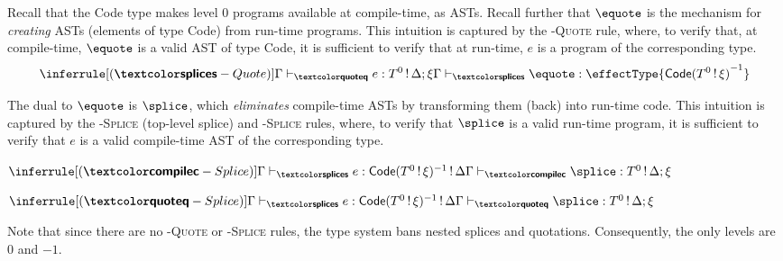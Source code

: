 Recall that the \textsf{Code} type makes level $0$ programs available at compile-time, as ASTs. Recall further that $\equote$ is the mechanism for \textit{creating} ASTs (elements of type \textsf{Code}) from run-time programs. This intuition is captured by the \textsc{\splicemode{}-Quote} rule, where, to verify that, at compile-time, $\equote$ is a valid AST of type \textsf{Code}, it is sufficient to verify that at run-time, $e$ is a program of the corresponding type.
\[\inferrule[(\splicemode{}-Quote)]{\qtypejudge{e}{\runtimecomptype{T^{0}}{\Delta ; \xi}}}{\stypejudge{\equote}{\effectType{\compiletimetype{\textsf{Code}(\runtimecomptype{T^{0}}{\xi})}^{-1}}}}\]

The dual to $\equote$ is $\splice$, which \textit{eliminates} compile-time ASTs by transforming them (back) into run-time code. This intuition is captured by the \textsc{\compilemode{}-Splice} (top-level splice) and \textsc{\quotemode{}-Splice} rules, where, to verify that $\splice$ is a valid run-time program, it is sufficient to verify that $e$ is a valid compile-time AST of the corresponding type. 

\begin{center}
\begin{minipage}[t]{0.5\textwidth}
  \centering
  $\inferrule[(\compilemode{}-Splice)]{\stypejudge[\Gamma]{e}{\textsf{Code}(T^0 \, ! \, \xi)^{-1} \, ! \, \Delta}}{\ctypejudge{\splice}{\runtimecomptype{T^0}{\Delta ; \xi}}}$
\end{minipage}%
\begin{minipage}[t]{0.5\textwidth}
  \centering
  $\inferrule[(\quotemode{}-Splice)]{\stypejudge[\Gamma]{e}{\textsf{Code}(T^0 \, ! \, \xi)^{-1} \, ! \, \Delta}}{\qtypejudge{\splice}{\runtimecomptype{T^0}{\Delta ; \xi}}}$
\end{minipage}
\end{center}


Note that since there are no \textsc{\quotemode-Quote} or \textsc{\splicemode-Splice} rules, the type system bans nested splices and quotations. Consequently, the only levels are $0$ and $-1$. 

